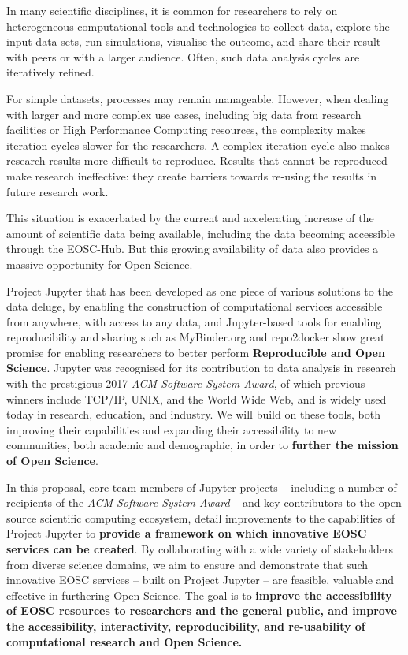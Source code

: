 
In many scientific disciplines, it is common for researchers to rely on
heterogeneous computational tools and technologies to collect data,
explore the input data sets, run simulations, visualise the outcome,
and share their result with peers or with a larger audience. Often,
such data analysis cycles are iteratively refined.

For simple datasets, processes may remain manageable. However, when
dealing with larger and more complex use cases, including big data
from research facilities or High Performance Computing resources, the
complexity makes iteration cycles slower for the researchers. A
complex iteration cycle also makes research results more difficult to
reproduce.
Results that cannot be reproduced make research ineffective: they
create barriers towards re-using the results in future research work.

This situation is exacerbated by the current and accelerating increase of the amount
of scientific data being available, including the data becoming
accessible through the EOSC-Hub. But this growing availability of data also provides a massive opportunity
for Open Science.

Project Jupyter that has been developed as one piece of various solutions to the data deluge,
by enabling the construction of computational services accessible from anywhere,
with access to any data,
and Jupyter-based tools for enabling reproducibility and sharing such as MyBinder.org and repo2docker
show great promise for enabling researchers to better perform \textbf{Reproducible and Open Science}.
Jupyter was recognised for its contribution to data analysis in research with the prestigious 2017 \emph{ACM Software System Award}, of which previous winners include TCP/IP, UNIX, and the World Wide Web,
and is widely used today in research,
education, and industry.
We will build on these tools,
both improving their capabilities
and expanding their accessibility to new communities,
both academic and demographic,
in order to \textbf{further the mission of Open Science}.

In this proposal, core team members of Jupyter projects -- including a
number of recipients of the \emph{ACM Software System Award} -- and key contributors to the
open source scientific computing ecosystem,
detail improvements to the
capabilities of Project Jupyter
to \textbf{provide a framework on which innovative EOSC services can be created}.
By collaborating with a wide variety of stakeholders from diverse
science domains,
we aim to ensure and demonstrate that such
innovative EOSC services -- built on Project Jupyter -- are feasible, valuable and effective in furthering Open Science.
The goal is to \textbf{improve the
accessibility of EOSC resources to researchers and the general public,
and improve the accessibility, interactivity, reproducibility, and
re-usability of computational research
and Open Science.}


